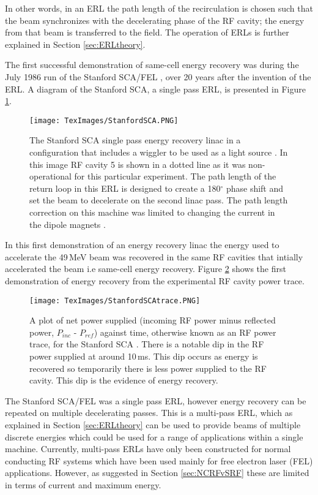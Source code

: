 \documentclass[11pt]{article}
\begin{document}
In other words, in an ERL the path length of the recirculation is chosen such that the beam synchronizes with the decelerating phase of the RF cavity; the energy from that beam is transferred to the field. The operation of ERLs is further explained in Section \ref{sec:ERLtheory}.

\vspace{5mm}

The first successful demonstration of same-cell energy recovery was during the July 1986 run of the Stanford SCA/FEL \cite{StanfordSCA}, over 20 years after the invention of the ERL. A diagram of the Stanford SCA, a single pass ERL, is presented in Figure \ref{fig:StanfordSCA}.

\begin{figure}[H]
\centering
\texttt{[image: TexImages/StanfordSCA.PNG]}
\caption{\label{fig:StanfordSCA} The Stanford SCA single pass energy recovery linac in a configuration that includes a wiggler to be used as a light source \cite{StanfordSCA}. In this image RF cavity 5 is shown in a dotted line as it was non-operational for this particular experiment. The path length of the return loop in this ERL is designed to create a 180$^{\circ}$ phase shift and set the beam to decelerate on the second linac pass. The path length correction on this machine was limited to changing the current in the dipole magnets \cite{StanfordSCA}.}
\end{figure}

In this first demonstration of an energy recovery linac the energy used to accelerate the 49\,MeV beam was recovered in the same RF cavities that intially accelerated the beam i.e same-cell energy recovery. Figure \ref{fig:StanfordSCAtrace} shows the first demonstration of energy recovery from the experimental RF cavity power trace. 

\begin{figure}[H]
\centering
\texttt{[image: TexImages/StanfordSCAtrace.PNG]}
\caption{\label{fig:StanfordSCAtrace} A plot of net power supplied (incoming RF power minus reflected power, $P_{inc}$ - $P_{ref}$) against time, otherwise known as an RF power trace, for the Stanford SCA \cite{StanfordSCA}. There is a notable dip in the RF power supplied at around 10\,ms. This dip occurs as energy is recovered so temporarily there is less power supplied to the RF cavity. This dip is the evidence of energy recovery.}
\end{figure}

The Stanford SCA/FEL was a single pass ERL, however energy recovery can be repeated on multiple decelerating passes. This is a multi-pass ERL, which as explained in Section \ref{sec:ERLtheory} can be used to provide beams of multiple discrete energies which could be used for a range of applications within a single machine. Currently, multi-pass ERLs have only been constructed for normal conducting RF systems which have been used mainly for free electron laser (FEL) applications. However, as suggested in Section \ref{sec:NCRFvSRF} these are limited in terms of current and maximum energy.
\end{document}

